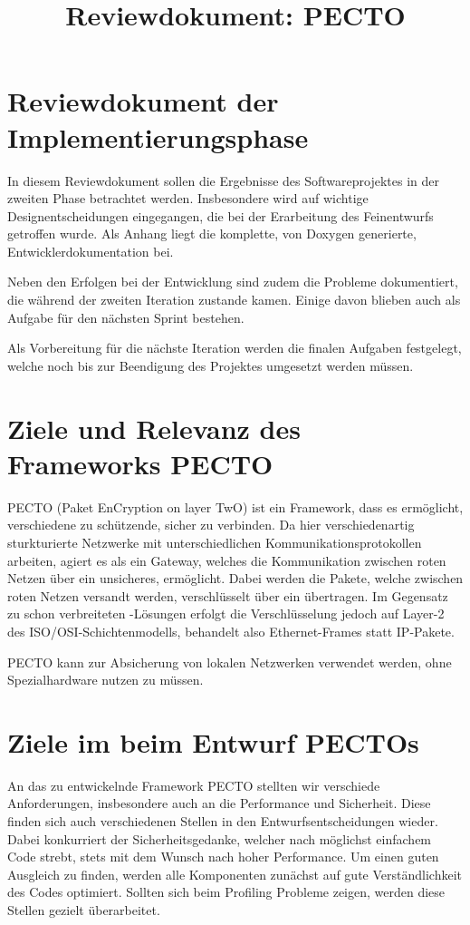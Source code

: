 \documentclass[a4paper, 11pt, ngerman, fleqn]{article}
\begin{document}
\title{Reviewdokument: PECTO}
\vspace{3 in}
\maketitle
\clearpage
\tableofcontents
\clearpage


\section*{Reviewdokument der Implementierungsphase}
In diesem Reviewdokument sollen die Ergebnisse des Softwareprojektes in der zweiten Phase betrachtet werden.
Insbesondere wird auf wichtige Designentscheidungen eingegangen, die bei der Erarbeitung des Feinentwurfs getroffen wurde.
Als Anhang liegt die komplette, von Doxygen generierte, Entwicklerdokumentation bei.

Neben den Erfolgen bei der Entwicklung sind zudem die Probleme dokumentiert, die während der zweiten Iteration zustande kamen. Einige davon blieben auch als Aufgabe für den nächsten Sprint bestehen. 

Als Vorbereitung für die nächste Iteration werden die finalen Aufgaben festgelegt, welche noch bis zur Beendigung des Projektes umgesetzt werden müssen. 

\clearpage
\section{Ziele und Relevanz des Frameworks PECTO}
PECTO (Paket EnCryption on layer TwO) ist ein Framework, dass es ermöglicht, verschiedene zu schützende,  sicher zu verbinden.  
Da hier verschiedenartig sturkturierte Netzwerke mit unterschiedlichen Kommunikationsprotokollen arbeiten, agiert es als ein Gateway, welches die Kommunikation zwischen roten Netzen über ein unsicheres,  ermöglicht. 
Dabei werden die Pakete, welche zwischen roten Netzen versandt werden, verschlüsselt über ein  übertragen.
Im Gegensatz zu schon verbreiteten -Lösungen erfolgt die Verschlüsselung jedoch auf Layer-2 des ISO/OSI-Schichtenmodells, behandelt also Ethernet-Frames statt IP-Pakete.

PECTO kann zur Absicherung von lokalen Netzwerken verwendet werden, ohne Spezialhardware nutzen zu müssen.

\clearpage
\section{Ziele im beim Entwurf PECTOs}
An das zu entwickelnde Framework PECTO stellten wir verschiede Anforderungen, insbesondere auch an die Performance und Sicherheit. 
Diese finden sich auch verschiedenen Stellen in den Entwurfsentscheidungen wieder.  
Dabei konkurriert der Sicherheitsgedanke, welcher nach möglichst einfachem Code strebt, stets mit dem Wunsch nach hoher Performance.
Um einen guten Ausgleich zu finden, werden alle Komponenten zunächst auf gute Verständlichkeit des Codes optimiert.
Sollten sich beim Profiling Probleme zeigen, werden diese Stellen gezielt überarbeitet.
\end{document}
